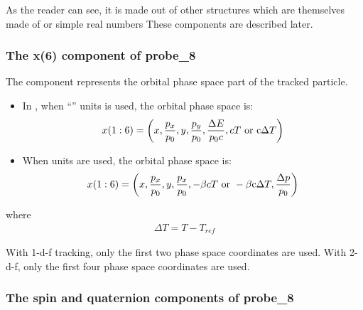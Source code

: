 \documentclass[english,12pt,article]{article} %
\begin{document}
As the reader can see, it is made out of other structures which are themselves made of  or simple real numbers These components are described later.

\subsubsection{The x(6) component of probe_8}\label{sec:codetypex6}

The  component represents the orbital phase space part of the tracked particle.
 
 \begin{itemize}
\item In , when ``'' units is used, the orbital phase space is: 
%
\begin{align} x(1:6)=
\left({x,{{p}_{x} \over {p}_{0}},y,{{p}_{y} \over {p}_{0}},{\Delta E \over {p}_{0}c},cT~{\rm o}{\rm r}~{\rm c}\Delta T}\right) \end{align}
\item When  units are used, the orbital phase space is:
%
\begin{align} x(1:6)=
\left({x,{{p}_{x} \over {p}_{0}},y,{{p}_{x} \over {p}_{0}},-\beta cT~{\rm o}{\rm r}~-\beta {\rm c}\Delta T,{\Delta p \over {p}_{0}}}\right) \end{align}
\end{itemize}
where
%
\begin{align} \Delta T=
T-{T}_{ref} \end{align}

With 1-d-f tracking, only the first two phase space coordinates are used. With 2-d-f, only the first four phase space coordinates are used.

\subsubsection{The spin and quaternion components of probe_8}\label{sec:code spin}
\end{document}
